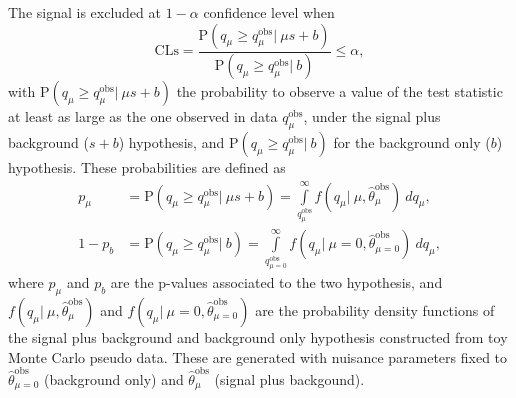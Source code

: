 The signal is excluded at $1-\alpha$ confidence level when 
\begin{equation}
\mathrm{CLs} = \frac{\mathrm{P}\left(q_{\mu} \geq q_{\mu}^{\mathrm{obs}}|\: \mu s + b\right)}{\mathrm{P}\left(q_{\mu} \geq q_{\mu}^{\mathrm{obs}}| \:b\right)} \leq \alpha, 
\end{equation}
with $ \mathrm{P}\left(q_{\mu} \geq q_{\mu}^{\mathrm{obs}}|\: \mu s + b\right)$ the probability to observe a value of the test statistic at least as large as the one observed in data $q_{\mu}^{\mathrm{obs}}$, under the signal plus background ($s+b$) hypothesis, and $\mathrm{P}\left(q_{\mu} \geq q_{\mu}^{\mathrm{obs}}|\:  b\right)$ for the background only ($b$) hypothesis. 
These probabilities are defined as 
\begin{equation}
\begin{aligned}
  p_{\mu} &= \mathrm{P}\left(q_{\mu} \geq q_{\mu}^{\mathrm{obs}}|\: \mu s + b\right) = \int \limits_{q^{\mathrm{obs}}_{\mu}}^{\infty} f(q_{\mu}|\: \mu, \hat{\theta}_{\mu}^{\mathrm{obs}}) \:dq_{\mu}, \\
  1-p_{b} &= \mathrm{P}\left(q_{\mu} \geq q_{\mu}^{\mathrm{obs}}|\:  b\right) = \int \limits_{q^{\mathrm{obs}}_{\mu=0}}^{\infty} f(q_{\mu}|\: \mu=0, \hat{\theta}_{\mu=0}^{\mathrm{obs}}) \:dq_{\mu}, 
\end{aligned}
\end{equation}
where $ p_{\mu}$ and $ p_{b}$ are the p-values associated to the two hypothesis, and  $f(q_{\mu}|\: \mu, \hat{\theta}_{\mu}^{\mathrm{obs}})$ and $f(q_{\mu}|\: \mu=0, \hat{\theta}_{\mu=0}^{\mathrm{obs}})$ are the probability density functions of the signal plus background and background only hypothesis constructed from toy Monte Carlo pseudo data. These are generated with nuisance parameters fixed to $\hat{\theta}_{\mu=0}^{\mathrm{obs}}$ (background only) and $\hat{\theta}_{\mu}^{\mathrm{obs}}$ (signal plus backgound).
